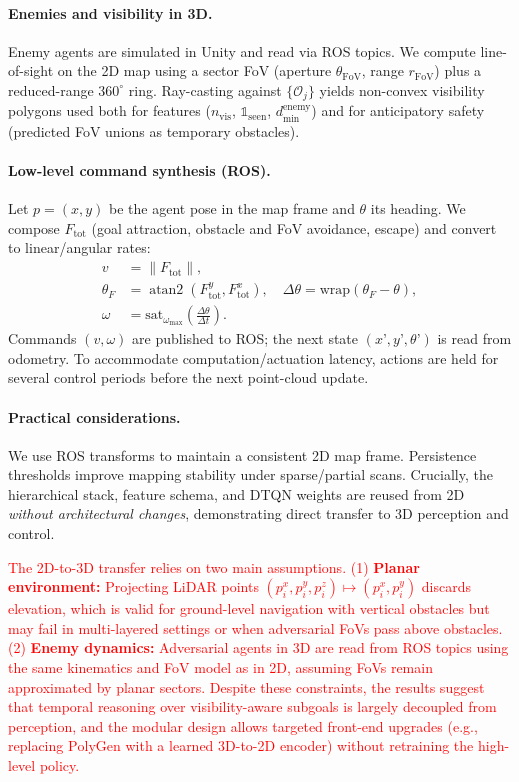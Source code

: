 \documentclass[letterpaper, 10 pt, conference]{ieeeconf}
\begin{document}
\paragraph{Enemies and visibility in 3D.}
Enemy agents are simulated in Unity and read via ROS topics. We compute line-of-sight on the 2D map using a sector FoV (aperture $\theta_{\mathrm{FoV}}$, range $r_{\mathrm{FoV}}$) plus a reduced-range $360^\circ$ ring. Ray-casting against $\{\mathcal{O}_j\}$ yields non-convex visibility polygons used both for features ($n_{\mathrm{vis}}$, $\mathbb{1}_{\mathrm{seen}}$, $d_{\min}^{\mathrm{enemy}}$) and for anticipatory safety (predicted FoV unions as temporary obstacles).

\paragraph{Low-level command synthesis (ROS).}
Let $p=(x,y)$ be the agent pose in the map frame and $\theta$ its heading. We compose $F_{\mathrm{tot}}$ (goal attraction, obstacle and FoV avoidance, escape) and convert to linear/angular rates:
\begin{align}
v &= \|F_{\mathrm{tot}}\|, \\
\theta_F &= \operatorname{atan2}(F_{\mathrm{tot}}^y, F_{\mathrm{tot}}^x), \quad
\Delta\theta = \mathrm{wrap}(\theta_F-\theta), \\
\omega &= \mathrm{sat}_{\omega_{\max}}\!\left(\frac{\Delta\theta}{\Delta t}\right).
\end{align}
Commands $(v,\omega)$ are published to ROS; the next state $(x’,y’,\theta’)$ is read from odometry. To accommodate computation/actuation latency, actions are held for several control periods before the next point-cloud update.

\paragraph{Practical considerations.}
We use ROS transforms to maintain a consistent 2D map frame. Persistence thresholds improve mapping stability under sparse/partial scans. Crucially, the hierarchical stack, feature schema, and DTQN weights are reused from 2D \emph{without architectural changes}, demonstrating direct transfer to 3D perception and control.

\textcolor{red}{The 2D-to-3D transfer relies on two main assumptions.
(1) \textbf{Planar environment:} Projecting LiDAR points $(p_i^x, p_i^y, p_i^z) \mapsto (p_i^x, p_i^y)$ discards elevation, which is valid for ground-level navigation with vertical obstacles but may fail in multi-layered settings or when adversarial FoVs pass above obstacles.
(2) \textbf{Enemy dynamics:} Adversarial agents in 3D are read from ROS topics using the same kinematics and FoV model as in 2D, assuming FoVs remain approximated by planar sectors.
Despite these constraints, the results suggest that temporal reasoning over visibility-aware subgoals is largely decoupled from perception, and the modular design allows targeted front-end upgrades (e.g., replacing $\mathrm{PolyGen}$ with a learned 3D-to-2D encoder) without retraining the high-level policy.}
\end{document}
